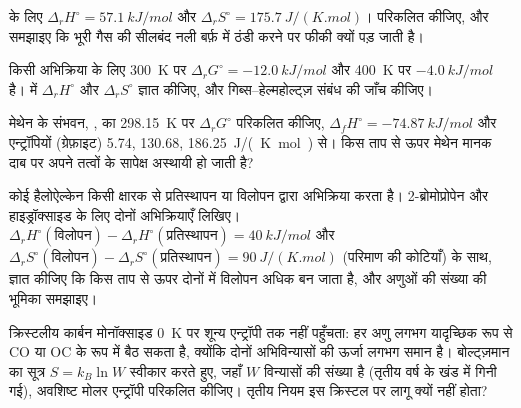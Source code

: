 \begin{exercise}[$\star\star$]\label{exo:b2:reaction-free-energy:6}
 के लिए $\Delta_r H^\circ = \qty{57.1}{kJ/mol}$ और
$\Delta_r S^\circ = \qty{175.7}{J/(K.mol)}$।  परिकलित कीजिए, और समझाइए कि भूरी गैस  की सीलबंद नली
बर्फ़ में ठंडी करने पर फीकी क्यों पड़ जाती है।
\end{exercise}

\begin{exercise}[$\star\star$]\label{exo:b2:reaction-free-energy:7}
किसी अभिक्रिया के लिए \qty{300}{K} पर $\Delta_r G^\circ = \qty{-12.0}{kJ/mol}$
और \qty{400}{K} पर $\qty{-4.0}{kJ/mol}$ है।  में
$\Delta_r H^\circ$ और $\Delta_r S^\circ$ ज्ञात कीजिए, और
गिब्स--हेल्महोल्ट्ज़ संबंध की जाँच कीजिए।
\end{exercise}

\begin{exercise}[$\star\star$]\label{exo:b2:reaction-free-energy:8}
मेथेन के संभवन, , का \qty{298.15}{K} पर $\Delta_r G^\circ$ परिकलित कीजिए, $\Delta_f H^\circ = \qty{-74.87}{kJ/mol}$
और एन्ट्रॉपियों  (ग्रेफ़ाइट) 5.74,  130.68, 
\qty{186.25}{J/(K.mol)} से। किस ताप से ऊपर मेथेन मानक दाब पर अपने
तत्वों के सापेक्ष अस्थायी हो जाती है?
\end{exercise}

\begin{exercise}[$\star\star$]\label{exo:b2:reaction-free-energy:9}
कोई हैलोऐल्केन किसी क्षारक से प्रतिस्थापन या विलोपन द्वारा अभिक्रिया करता है।
2-ब्रोमोप्रोपेन और हाइड्रॉक्साइड के लिए दोनों अभिक्रियाएँ लिखिए। $\Delta_r
H^\circ(\text{विलोपन}) - \Delta_r H^\circ(\text{प्रतिस्थापन}) =
\qty{+40}{kJ/mol}$ और $\Delta_r S^\circ(\text{विलोपन}) - \Delta_r
S^\circ(\text{प्रतिस्थापन}) = \qty{+90}{J/(K.mol)}$ (परिमाण की कोटियाँ) के साथ,
ज्ञात कीजिए कि किस ताप से ऊपर दोनों में विलोपन अधिक  बन जाता है,
और अणुओं की संख्या की भूमिका समझाइए।
\end{exercise}

\begin{exercise}[$\star\star\star$]\label{exo:b2:reaction-free-energy:10}
क्रिस्टलीय कार्बन मोनॉक्साइड \qty{0}{K} पर शून्य एन्ट्रॉपी तक नहीं पहुँचता: हर
अणु लगभग यादृच्छिक रूप से CO या OC के रूप में बैठ सकता है, क्योंकि दोनों अभिविन्यासों की
ऊर्जा लगभग समान है। बोल्ट्ज़मान का सूत्र $S = k_B\ln W$ स्वीकार करते हुए, जहाँ
$W$ विन्यासों की संख्या है (तृतीय वर्ष के खंड में गिनी गई), अवशिष्ट
मोलर एन्ट्रॉपी परिकलित कीजिए। तृतीय नियम इस क्रिस्टल पर
लागू क्यों नहीं होता?
\end{exercise}

